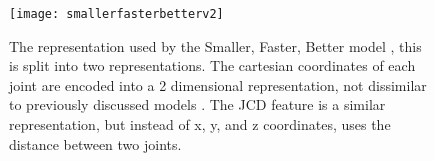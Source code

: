 \begin{figure}[ht]
	\texttt{[image: smallerfasterbetterv2]}
	\centering
	\caption{The representation used by the Smaller, Faster, Better model \cite{smaller_faster_better}, this is split into two representations. The cartesian coordinates of each joint are encoded into a 2 dimensional representation, not dissimilar to previously discussed models \cite{simple_yet_efficient}. The JCD feature is a similar representation, but instead of x, y, and z coordinates, uses the distance between two joints.}
	\label{fig:smallerfasterbetter}
\end{figure}